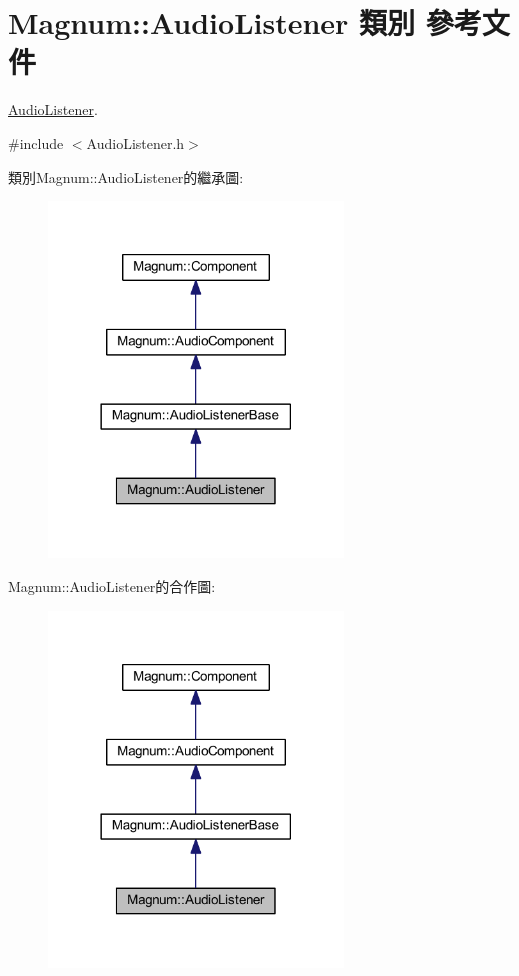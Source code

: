 \hypertarget{class_magnum_1_1_audio_listener}{}\section{Magnum\+:\+:Audio\+Listener 類別 參考文件}
\label{class_magnum_1_1_audio_listener}


\hyperlink{class_magnum_1_1_audio_listener}{Audio\+Listener}.  




{\ttfamily \#include $<$Audio\+Listener.\+h$>$}



類別\+Magnum\+:\+:Audio\+Listener的繼承圖\+:\nopagebreak
\begin{figure}[H]
\begin{center}
\leavevmode
\includegraphics[width=222pt]{class_magnum_1_1_audio_listener__inherit__graph}
\end{center}
\end{figure}


Magnum\+:\+:Audio\+Listener的合作圖\+:\nopagebreak
\begin{figure}[H]
\begin{center}
\leavevmode
\includegraphics[width=222pt]{class_magnum_1_1_audio_listener__coll__graph}
\end{center}
\end{figure}
